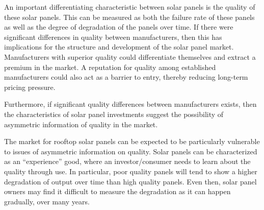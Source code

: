 \documentclass[a4paper]{article}
\begin{document}
An important differentiating characteristic between solar panels is the quality of these solar panels. This can be measured as both the failure rate of these panels as well as the degree of degradation of the panels over time. If there were significant differences in quality between manufacturers, then this has implications for the structure and development of the solar panel market. Manufacturers with superior quality could differentiate themselves and extract a premium in the market. A reputation for quality among established manufacturers could also act as a barrier to entry, thereby reducing long-term pricing pressure.

Furthermore, if significant quality differences between manufacturers exists, then the characteristics of solar panel investments suggest the possibility of asymmetric information of quality in the market.



The market for rooftop solar panels can be expected to be particularly vulnerable to issues of asymmetric information on quality. Solar panels can be characterized as an ``experience'' good, where an investor/consumer needs to learn about the quality through use. In particular, poor quality panels will tend to show a higher degradation of output over time than high quality panels. Even then, solar panel owners may find it difficult to measure the degradation as it can happen gradually, over many years.
\end{document}

